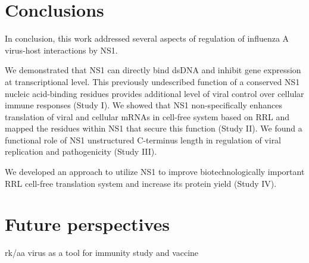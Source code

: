 \newpage
\section{Conclusions}

	In conclusion, this work addressed several aspects of regulation of influenza A virus-host interactions by NS1.
	
	We demonstrated that NS1 can directly bind dsDNA and inhibit gene expression at transcriptional level. This previously undescribed function of a conserved NS1 nucleic acid-binding residues provides additional level of viral control over cellular immune responses (Study I). We showed that NS1 non-specifically enhances translation of viral and cellular mRNAs in cell-free system based on \gls{RRL} and mapped the residues within NS1 that secure this function (Study II). We found a functional role of NS1 unstructured C-terminus length in regulation of viral replication and pathogenicity (Study III).
	
	We developed an approach to utilize NS1 to improve biotechnologically important \gls{RRL} cell-free translation system and increase its protein yield (Study IV).
	
	
\newpage
\section{Future perspectives}	
	
	
	rk/aa virus as a tool for immunity study and vaccine